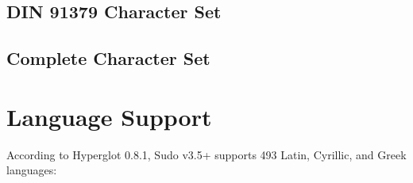 \documentclass[paper=a4, 10pt]{scrbook}
\begin{document}
\section{DIN 91379 Character Set}


\section{Complete Character Set}



\chapter{Language Support}\label{languages}

According to Hyperglot 0.8.1, Sudo v3.5+ supports 493 Latin, Cyrillic, and Greek languages:
\end{document}
